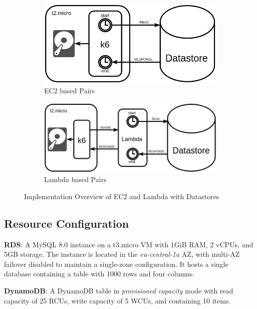 \begin{figure}[h]
	\centering
	\begin{subfigure}{0.40\linewidth}
		\centering
		\includegraphics[width=\linewidth]{./fig/ec2-pairs.png}
		\caption{EC2 based Pairs}
		\label{fig:impl_ec2_pairs}
	\end{subfigure}
	\hspace{1cm}
	\begin{subfigure}{0.46\linewidth}
		\centering
		\includegraphics[width=\linewidth]{./fig/lambda-pairs.png}
		\caption{Lambda based Pairs}
		\label{fig:impl_lambda_pairs}
	\end{subfigure}
	\caption{Implementation Overview of EC2 and Lambda with Datastores}
	\label{fig:impl_overview}
\end{figure}

\subsection{Resource Configuration}
\label{sec:config}

\textbf{RDS}:
A MySQL 8.0 instance on a t3.micro VM with 1GiB RAM, 2 vCPUs, and 5GB storage. The instance is located in the \textit{eu-central-1a} AZ, with multi-AZ failover disabled to maintain a single-zone configuration. It hosts a single database containing a table with 1000 rows and four columns.


\textbf{DynamoDB}:
A DynamoDB table in \textit{provisioned capacity} mode with read capacity of 25 RCUs, write capacity of 5 WCUs, and containing 10 items.

